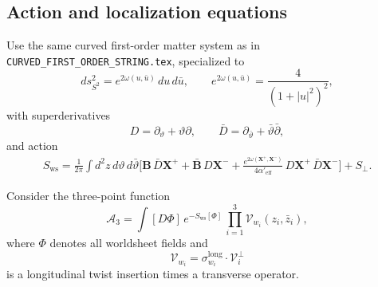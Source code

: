 \documentclass[11pt]{article}
\newcommand{\mc}[1]{\mathcal{#1}}
\newcommand{\Aeff}{\alpha'_{\mathrm{eff}}}
\begin{document}
\subsection{Action and localization equations}
Use the same curved first-order matter system as in \texttt{CURVED\_FIRST\_ORDER\_STRING.tex}, specialized to
\begin{equation}
ds^2_{S^2}=e^{2\omega(u,\bar u)}\,du\,d\bar u,
\qquad
e^{2\omega(u,\bar u)}=\frac{4}{(1+|u|^2)^2},
\end{equation}
with superderivatives
\begin{equation}
D=\partial_\vartheta+\vartheta\partial,\qquad
\bar D=\partial_{\bar\vartheta}+\bar\vartheta\bar\partial,
\end{equation}
and action
\begin{equation}\label{eq:worldsheet-action}
\begin{aligned}
S_{\mathrm{ws}}
=
\frac{1}{2\pi}\int d^2z\,d\vartheta\,d\bar\vartheta
\Big[
\mathbf B\,\bar D\mathbf X^+
+\bar{\mathbf B}\,D\mathbf X^-
+\frac{e^{2\omega(\mathbf X^+,\mathbf X^-)}}{4\Aeff}\,
D\mathbf X^+\,\bar D\mathbf X^-
\Big]
+S_\perp.
\end{aligned}
\end{equation}

Consider the three-point function
\begin{equation}\label{eq:A3-pathintegral}
\mc A_3
=
\int [D\Phi]\,
e^{-S_{\mathrm{ws}}[\Phi]}\,
\prod_{i=1}^3 \mc V_{w_i}(z_i,\bar z_i),
\end{equation}
where $\Phi$ denotes all worldsheet fields and
\begin{equation}
\mc V_{w_i}=\sigma_{w_i}^{\mathrm{long}}\cdot \mc V_i^\perp
\end{equation}
is a longitudinal twist insertion times a transverse operator.
\end{document}
